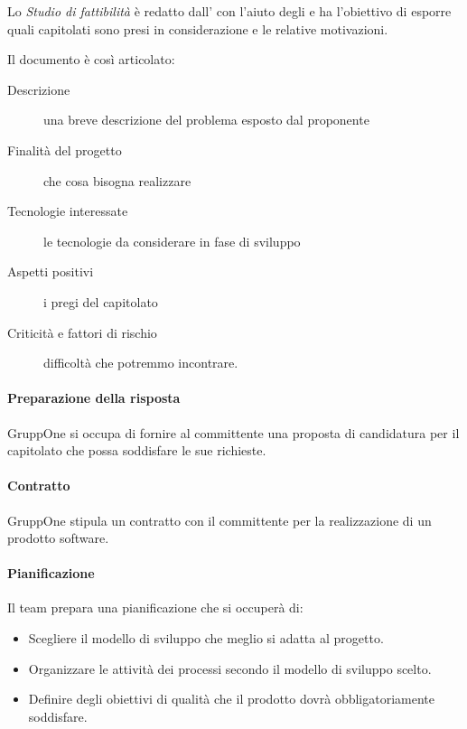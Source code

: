 \documentclass[../../norme-di-progetto.tex]{subfiles}
\begin{document}
Lo \textit{Studio di fattibilità} è redatto dall' con l'aiuto degli  e ha l'obiettivo di esporre quali capitolati sono presi in considerazione e le relative motivazioni.

Il documento è così articolato:
\begin{description}
  \item [Descrizione] una breve descrizione del problema esposto dal proponente
  \item [Finalità del progetto] che cosa bisogna realizzare
  \item [Tecnologie interessate] le tecnologie da considerare in fase di sviluppo
  \item [Aspetti positivi] i pregi del capitolato
  \item [Criticità e fattori di rischio] difficoltà che potremmo incontrare.
\end{description}

\paragraph{Preparazione della risposta}%
\label{subs:preparazione_della_risposta}

GruppOne si occupa di fornire al committente una proposta di candidatura per il capitolato che possa soddisfare le sue richieste.

\paragraph{Contratto}%
\label{par:contratto}

GruppOne stipula un contratto con il committente per la realizzazione di un prodotto software.

\paragraph{Pianificazione}%
\label{par:pianificazione}

Il team prepara una pianificazione che si occuperà di:
\begin{itemize}
  \item Scegliere il modello di sviluppo che meglio si adatta al progetto.
  \item Organizzare le attività dei processi secondo il modello di sviluppo scelto.
  \item Definire degli obiettivi di qualità che il prodotto dovrà obbligatoriamente soddisfare.
\end{itemize}
\end{document}
